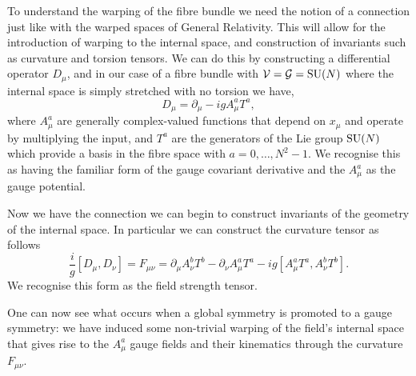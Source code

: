 To understand the warping of the fibre bundle we need the notion of a connection just like with the warped spaces of General Relativity.
This will allow for the introduction of warping to the internal space, and construction of invariants such as curvature and torsion tensors.
We can do this by constructing a differential operator $D_{\mu}$, and in our case of a fibre bundle with $\mathcal{V}=\mathcal{G}={\mathrm{SU}(N)}$ where the internal space is simply stretched with no torsion we have,
\begin{equation}
\label{eq:theory:g_connection}
D_{\mu} = \partial_{\mu} - igA_{\mu}^{a} T^{a},
\end{equation}
where $A_{\mu}^{a}$ are generally complex-valued functions that depend on $x_{\mu}$ and operate by multiplying the input, and $T^{a}$ are the generators of the Lie group ${\mathrm{SU}(N)}$ which provide a basis in the fibre space with $a = 0,\ldots,N^{2}-1$.
We recognise this as having the familiar form of the gauge covariant derivative and the $A_{\mu}^{a}$ as the gauge potential. 

Now we have the connection we can begin to construct invariants of the geometry of the internal space. In particular we can construct the curvature tensor as follows
\begin{equation}
    \label{eq:theory:g_curvature}
    \frac{i}{g}[D_{\mu},D_{\nu}] = F_{\mu\nu} = \partial_{\mu} A^{b}_{\nu} T^{b} - \partial_{\nu} A^{a}_{\mu} T^{a} - ig[A^{a}_{\mu}T^{a}, A^{b}_{\nu}T^{b}].
\end{equation}
We recognise this form as the field strength tensor.

One can now see what occurs when a global symmetry is promoted to a gauge symmetry: we have induced some non-trivial warping of the field's internal space that gives rise to the $A^{a}_{\mu}$ gauge fields and their kinematics through the curvature $F_{\mu\nu}$.

